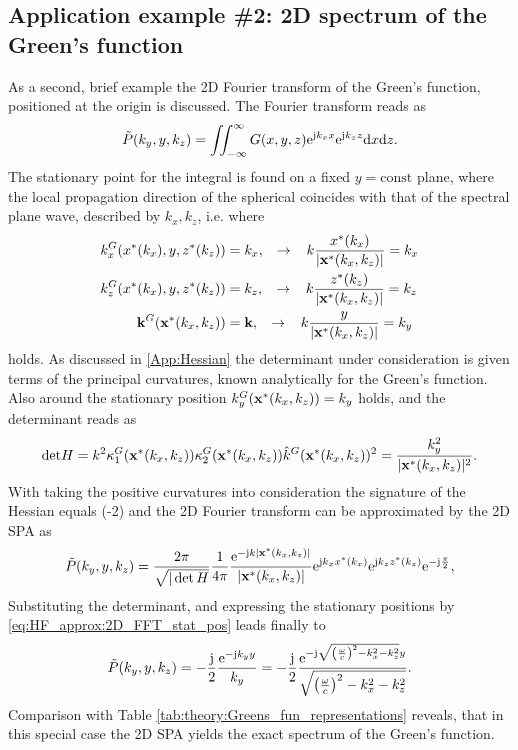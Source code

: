 \subsection*{Application example \#2: 2D spectrum of the Green's function}
As a second, brief example the 2D Fourier transform of the Green's function, positioned at the origin is discussed.
The Fourier transform reads as
\begin{equation}
\tilde{P}(k_y,y,k_z) = \iint^{\infty}_{-\infty} G(x,y,z) \mathrm{e}^{\mathrm{j} k_x x} \mathrm{e}^{\mathrm{j} k_z z} \mathrm{d} x \mathrm{d} z.
\end{equation}
The stationary point for the integral is found on a fixed $y = \text{const}$ plane, where the local propagation direction of the spherical coincides with that of the spectral plane wave, described by $k_x, k_z$, i.e. where
\begin{align}
\label{eq:HF_approx:2D_FFT_stat_pos}
k_x^G(x^*(k_x),y,z^*(k_z)) &= k_x, \hspace{3mm} \rightarrow \hspace{3mm} k\frac{x^*(k_x)}{|\mathbf{x}^*(k_x,k_z)|} = k_x \\
k_z^G(x^*(k_x),y,z^*(k_z)) &= k_z, \hspace{3mm} \rightarrow \hspace{3mm} k\frac{z^*(k_z)}{|\mathbf{x}^*(k_x,k_z)|} = k_z \\
\mathbf{k}^G(\mathbf{x}^*(k_x,k_z)) &= \mathbf{k},      \hspace{3mm} \rightarrow \hspace{3mm} k\frac{y}{|\mathbf{x}^*(k_x,k_z)|} = k_y
\end{align} 
holds.
As discussed in \ref{App:Hessian} the determinant under consideration is given terms of the principal curvatures, known analytically for the Green's function.
Also around the stationary position $k_y^G(\mathbf{x}^*(k_x,k_z)) = k_y$ holds, and the determinant reads as
\begin{equation}
\mathrm{det} H = k^2 \kappa^G_1(\mathbf{x}^*(k_x,k_z))\kappa^G_2(\mathbf{x}^*(k_x,k_z)) \hat{k}^G(\mathbf{x}^*(k_x,k_z))^2 = \frac{k_y^2}{|\mathbf{x}^*(k_x,k_z)|^2}.
\end{equation}
With taking the positive curvatures into consideration the signature of the Hessian equals (-2) and the 2D Fourier transform can be approximated by the 2D SPA as
\begin{equation}
\tilde{P}(k_y,y,k_z) = \frac{2\pi}{\sqrt{|\det H}} \frac{1}{4\pi} \frac{\mathrm{e}^{-\mathrm{j} k |\mathbf{x}^*(k_x,k_z)|}}{|\mathbf{x}^*(k_x,k_z)|} \mathrm{e}^{\mathrm{j} k_x x^*(k_x)} \mathrm{e}^{\mathrm{j} k_z z^*(k_z)} \mathrm{e}^{-\mathrm{j} \frac{\pi}{2}},
\end{equation}
Substituting the determinant, and expressing the stationary positions by \eqref{eq:HF_approx:2D_FFT_stat_pos} leads finally to
\begin{equation}
\tilde{P}(k_y,y,k_z) =-\frac{\mathrm{j}}{2} \frac{\mathrm{e}^{-\mathrm{j} k_y y } }{k_y} =
-\frac{\mathrm{j}}{2} \frac{\mathrm{e}^{-\mathrm{j} \sqrt{\left(\frac{\omega}{c}\right)^2-k_x^2-k_z^2} y } }{ \sqrt{\left(\frac{\omega}{c}\right)^2-k_x^2-k_z^2} }.
\end{equation}
Comparison with Table \eqref{tab:theory:Greens_fun_representations} reveals,  that in this special case the 2D SPA yields the exact spectrum of the Green's function.